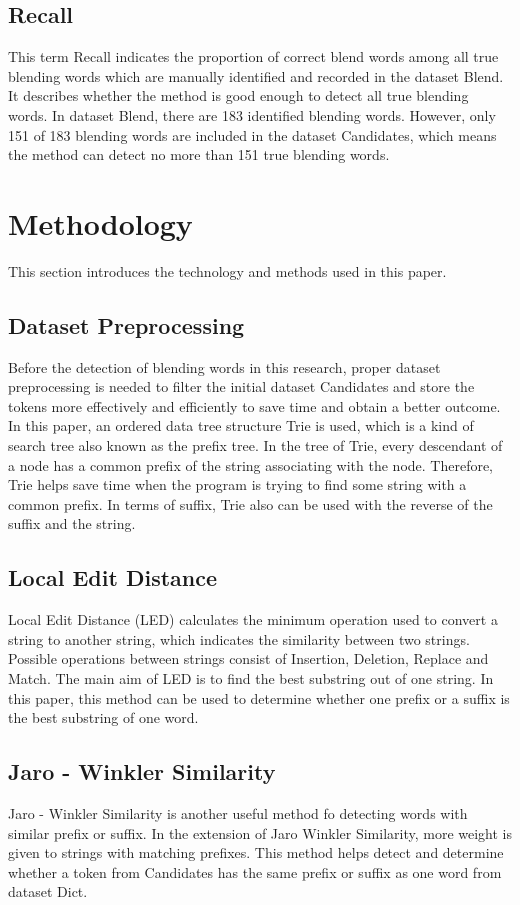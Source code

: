 \documentclass[11pt]{article}
\begin{document}
\subsection{Recall}
This term Recall indicates the proportion of correct blend words among all true blending words which are manually identified and recorded in the dataset Blend. It describes whether the method is good enough to detect all true blending words. In dataset Blend, there are 183 identified blending words. However, only 151 of 183 blending words are included in the dataset Candidates, which means the method can detect no more than 151 true blending words.

\section{Methodology}
This section introduces the technology and methods used in this paper.

\subsection{Dataset Preprocessing}
Before the detection of blending words in this research, proper dataset preprocessing is needed to filter the initial dataset Candidates and store the tokens more effectively and efficiently to save time and obtain a better outcome. In this paper, an ordered data tree structure Trie is used, which is a kind of search tree also known as the prefix tree. In the tree of Trie, every descendant of a node has a common prefix of the string associating with the node. Therefore, Trie helps save time when the program is trying to find some string with a common prefix. In terms of suffix, Trie also can be used with the reverse of the suffix and the string. 

\subsection{Local Edit Distance}
Local Edit Distance (LED) calculates the minimum operation used to convert a string to another string, which indicates the similarity between two strings. Possible operations between strings consist of Insertion, Deletion, Replace and Match. The main aim of LED is to find the best substring out of one string. In this paper, this method can be used to determine whether one prefix or a suffix is the best substring of one word.

\subsection{Jaro - Winkler Similarity}
Jaro - Winkler Similarity is another useful method fo detecting words with similar prefix or suffix. In the extension of Jaro Winkler Similarity, more weight is given to strings with matching prefixes. This method helps detect and determine whether a token from Candidates has the same prefix or suffix as one word from dataset Dict.
\end{document}
